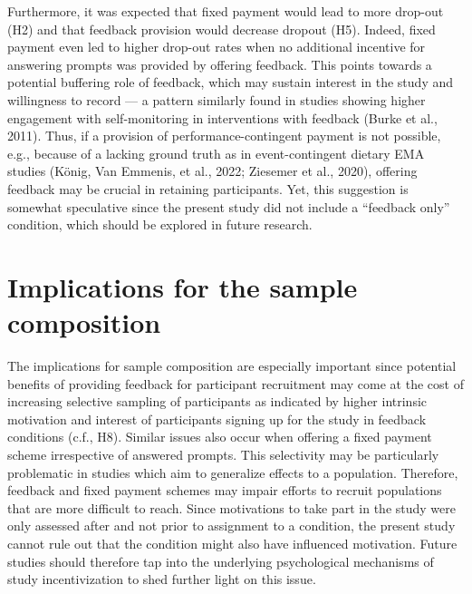 \documentclass[authordate, empirical]{jote-new-article}
\begin{document}
	Furthermore, it was expected that fixed payment would lead to more drop-out (H2) and that feedback provision would decrease dropout (H5). Indeed, fixed payment even led to higher drop-out rates when no additional incentive for answering prompts was provided by offering feedback. This points towards a potential buffering role of feedback, which may sustain interest in the study and willingness to record — a pattern similarly found in studies showing higher engagement with self-monitoring in interventions with feedback (Burke et al., 2011). Thus, if a provision of performance-contingent payment is not possible, e.g., because of a lacking ground truth as in event-contingent dietary EMA studies (König, Van Emmenis, et al., 2022; Ziesemer et al., 2020), offering feedback may be crucial in retaining participants. Yet, this suggestion is somewhat speculative since the present study did not include a “feedback only” condition, which should be explored in future research.



	\section{\textbf{Implications for the sample composition}}



	The implications for sample composition are especially important since potential benefits of providing feedback for participant recruitment may come at the cost of increasing selective sampling of participants as indicated by higher intrinsic motivation and interest of participants signing up for the study in feedback conditions (c.f., H8). Similar issues also occur when offering a fixed payment scheme irrespective of answered prompts. This selectivity may be particularly problematic in studies which aim to generalize effects to a population. Therefore, feedback and fixed payment schemes may impair efforts to recruit populations that are more difficult to reach. Since motivations to take part in the study were only assessed after and not prior to assignment to a condition, the present study cannot rule out that the condition might also have influenced motivation. Future studies should therefore tap into the underlying psychological mechanisms of study incentivization to shed further light on this issue.
\end{document}
